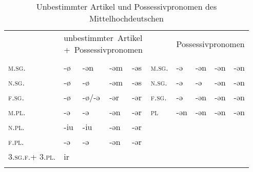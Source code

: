 

\begin{table}[H]
	\caption{Unbestimmter Artikel und Possessivpronomen des Mittelhochdeutschen \citep[216-217, 231]{Paul2007}}\label{table102}
	\begin{tabular}{llllllllll}
		\lsptoprule
		& \multicolumn{4}{p{4cm}}{\mbox{unbestimmter Artikel}\newline \mbox{+ Possessivpronomen}}  & & \multicolumn{4}{l}{Possessivpronomen}\\\cmidrule(lr){2-5}\cmidrule(lr){7-10}
		& \NOM & \AKK & \DAT & \GEN &  & \NOM & \AKK & \DAT & \GEN\\\midrule
		\textsc{m.sg.} & {}-ø & {}-ən & {}-əm & {}-əs & \textsc{m.sg.} & {}-ə & {}-ən & {}-ən & {}-ən\\
		\textsc{n.sg.} & {}-ø & {}-ø & {}-əm & {}-əs & \textsc{n.sg.} & {}-ə & {}-ə & {}-ən & {}-ən\\
		\textsc{f.sg.} & {}-ø & {}-ø/-ə & {}-ər & {}-ər & \textsc{f.sg.} & {}-ə & {}-ən & {}-ən & {}-ən\\
		\textsc{m.pl.} & {}-ə & {}-ə & {}-ən & {}-ər & \textsc{pl} & {}-ən & {}-ən & {}-ən & {}-ən\\
		\textsc{n.pl.} & {}-iu & {}-iu & {}-ən & {}-ər &  &  &  &  & \\
		\textsc{f.pl.} & {}-ə & {}-ə & {}-ən & {}-ər &  &  &  &  & \\
		\midrule
		\textsc{3.sg.f.+ 3.pl.} & ir &  &  &  &  &  &  &  & \\
		\lspbottomrule
	\end{tabular}
\end{table}


